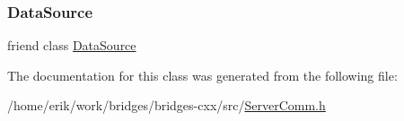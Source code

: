 \subsubsection{\texorpdfstring{Data\+Source}{DataSource}}
{\footnotesize\ttfamily friend class \hyperlink{classbridges_1_1_data_source}{Data\+Source}\hspace{0.3cm}{\ttfamily [friend]}}



The documentation for this class was generated from the following file\+:\begin{DoxyCompactItemize}
\item 
/home/erik/work/bridges/bridges-\/cxx/src/\hyperlink{_server_comm_8h}{Server\+Comm.\+h}\end{DoxyCompactItemize}
